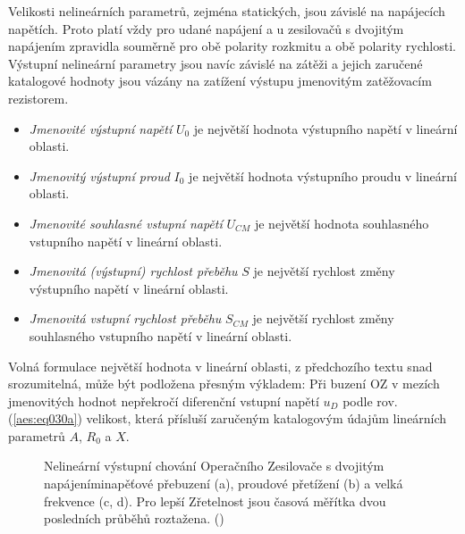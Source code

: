       Velikosti nelineárních parametrů, zejména statických, jsou závislé na napájecích napětích.
      Proto platí vždy pro udané napájení a u zesilovačů s dvojitým napájením zpravidla souměrně pro
      obě polarity rozkmitu a obě polarity rychlosti. Výstupní nelineární parametry jsou navíc
      závislé na zátěži a jejich zaručené katalogové hodnoty jsou vázány na zatížení výstupu
      jmenovitým zatěžovacím rezistorem.
      \begin{itemize}[noitemsep]
        \item \emph{Jmenovité výstupní napětí} \(U_0\) je největší hodnota výstupního napětí v
              lineární oblasti.         
        \item \emph{Jmenovitý výstupní proud} \(I_0\) je největší hodnota výstupního proudu v
              lineární oblasti. 
        \item \emph{Jmenovité souhlasné vstupní napětí} \(U_{CM}\) je největší hodnota souhlasného
              vstupního napětí v lineární oblasti.
        \item \emph{Jmenovitá (výstupní) rychlost přeběhu} \(S\) je největší rychlost změny
              výstupního napětí v lineární oblasti.
        \item \emph{Jmenovitá vstupní rychlost přeběhu} \(S_{CM}\) je největší rychlost změny
              souhlasného vstupního napětí v lineární oblasti.        
      \end{itemize}

      Volná formulace největší hodnota v lineární oblasti, z předchozího textu snad srozumitelná,
      může být podložena přesným výkladem: Při buzení OZ v mezích jmenovitých hodnot nepřekročí
      diferenční vstupní napětí \(u_D\) podle rov. (\ref{aes:eq030a}) velikost, která přísluší
      zaručeným katalogovým údajům lineárních parametrů \(A\), \(R_0\) a \(X\).

      \begin{figure}[ht!]  %
        \centering
        \hspace{1em}                                                       
        \newline                                                    
        \hspace{1em}                                                       
        \caption{Nelineární výstupní chování Operačního Zesilovače s dvojitým napájeníminapěťové
                přebuzení (a), proudové přetížení (b) a velká frekvence (c, d). Pro lepší Zřetelnost
                jsou časová měřítka dvou posledních průběhů roztažena. (\cite[s.~31]{Dostal})}
                \label{aes:fig058}
      \end{figure}

